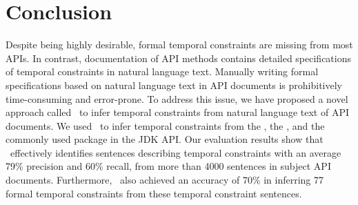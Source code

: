\section{Conclusion}
\label{sec:conclusion}
\vspace*{-1ex}
Despite being highly desirable, formal temporal constraints are missing from most APIs.
In contrast, documentation of API methods contains detailed specifications of temporal constraints in natural language text.
Manually writing formal specifications based on natural language text in API documents is prohibitively time-consuming and error-prone.
To address this issue, we have proposed a novel approach called \tool\ to infer temporal constraints from natural language text of API documents.
We used \tool\ to infer temporal constraints from
the \paypalAPI, the \amazonAPI, and the 
commonly used package  in the JDK API.
Our evaluation results show that \tool\ effectively identifies sentences describing
temporal constraints with an average 79\% precision and 60\% recall,
from more than 4000 sentences in subject API documents.
Furthermore, \tool\ also achieved an accuracy of
70\% in inferring 77 formal temporal constraints from these temporal constraint sentences.